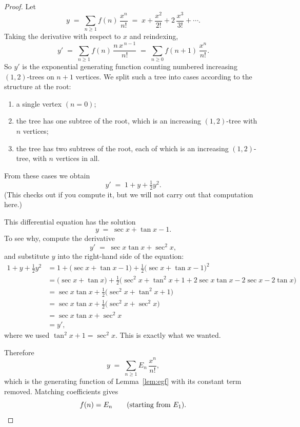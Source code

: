 \documentclass[11pt]{article}
\theoremstyle{definition}
\theoremstyle{plain}
\begin{document}
\begin{proof}
Let
\[
y \;=\; \sum_{n \ge 1} f(n)\, \frac{x^n}{n!}
   \;=\; x + \frac{x^2}{2!} + 2\,\frac{x^3}{3!} + \cdots .
\]
Taking the derivative with respect to $x$ and reindexing,
\[
y' \;=\; \sum_{n \ge 1} f(n)\, \frac{n\,x^{\,n-1}}{n!}
   \;=\; \sum_{n \ge 0} f(n+1)\, \frac{x^n}{n!}.
\]
So $y'$ is the exponential generating function counting numbered increasing
$(1,2)$-trees on $n+1$ vertices. We split such a tree into cases according to
the structure at the root:
\begin{enumerate}[label=(\alph*)]
  \item a single vertex $(n = 0)$;
  \item the tree has one subtree of the root, which is an increasing
        $(1,2)$-tree with $n$ vertices;
  \item the tree has two subtrees of the root, each of which is an increasing
        $(1,2)$-tree, with $n$ vertices in all.
\end{enumerate}
From these cases we obtain
\[
y' \;=\; 1 + y + \tfrac{1}{2} y^2 .
\]
(This checks out if you compute it, but we will not carry out that computation
here.)

\medskip

This differential equation has the solution
\[
y \;=\; \sec x + \tan x - 1 .
\]
To see why, compute the derivative
\[
y' \;=\; \sec x \tan x + \sec^2 x ,
\]
and substitute $y$ into the right-hand side of the equation:
\begin{align*}
1 + y + \tfrac{1}{2} y^2
 &= 1 + \bigl(\sec x + \tan x - 1\bigr)
      + \tfrac{1}{2}\bigl(\sec x + \tan x - 1\bigr)^2 \\[2pt]
 &= \bigl(\sec x + \tan x\bigr)
      + \tfrac{1}{2}\bigl(\sec^2 x + \tan^2 x + 1
        + 2\sec x \tan x - 2\sec x - 2\tan x\bigr) \\[2pt]
 &= \sec x \tan x + \tfrac{1}{2}\bigl(\sec^2 x + \tan^2 x + 1\bigr) \\[2pt]
 &= \sec x \tan x + \tfrac{1}{2}\bigl(\sec^2 x + \sec^2 x\bigr) \\[2pt]
 &= \sec x \tan x + \sec^2 x \\[2pt]
 &= y',
\end{align*}
where we used $\tan^2 x + 1 = \sec^2 x$. This is exactly what we wanted.

\medskip

Therefore
\[
y \;=\; \sum_{n \ge 1} E_n\, \frac{x^n}{n!},
\]
which is the generating function of Lemma~\ref{lem:egf} with its constant term
removed. Matching coefficients gives
\[
f(n) = E_n \qquad (\text{starting from } E_1). \qedhere
\]
\end{proof}
\end{document}
